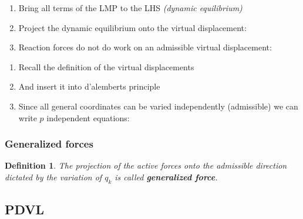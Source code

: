 \documentclass[10pt,a4paper]{scrartcl}
\newtheorem{define}{Definition}
\begin{document}
\begin{multicols*}{2}
\begin{enumerate}
\item Bring all terms of the LMP to the LHS \emph{(dynamic equilibrium)}

\item Project the dynamic equilibrium onto the virtual displacement:


\item Reaction forces do not do work on an admissible virtual displacement:

\end{enumerate}


\begin{enumerate}\addtocounter{enumi}{4}
\item Recall the definition of the virtual displacements

\item And insert it into d'alemberts principle
\item Since all general coordinates can be varied independently (admissible) we can write $p$ independent equations:
\end{enumerate}
\subsubsection{Generalized forces}
\begin{define}
The projection of the active forces onto the admissible direction dictated by the variation of $q_k$ is called \textbf{generalized force}.

\end{define}
\subsection{PDVL}

\end{multicols*}
\end{document}
